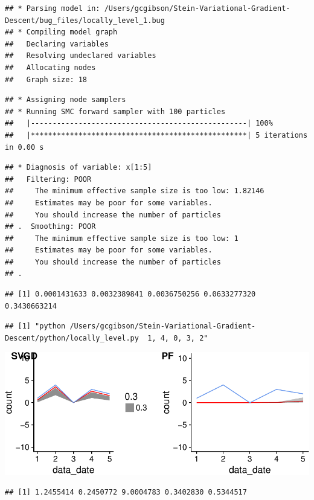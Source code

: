\documentclass[]{article}
\begin{document}
\begin{verbatim}
## * Parsing model in: /Users/gcgibson/Stein-Variational-Gradient-Descent/bug_files/locally_level_1.bug
## * Compiling model graph
##   Declaring variables
##   Resolving undeclared variables
##   Allocating nodes
##   Graph size: 18
\end{verbatim}

\begin{verbatim}
## * Assigning node samplers
## * Running SMC forward sampler with 100 particles
##   |--------------------------------------------------| 100%
##   |**************************************************| 5 iterations in 0.00 s
\end{verbatim}

\begin{verbatim}
## * Diagnosis of variable: x[1:5] 
##   Filtering: POOR
##     The minimum effective sample size is too low: 1.82146 
##     Estimates may be poor for some variables.
##     You should increase the number of particles
## .  Smoothing: POOR
##     The minimum effective sample size is too low: 1 
##     Estimates may be poor for some variables.
##     You should increase the number of particles
## .
\end{verbatim}

\begin{verbatim}
## [1] 0.0001431633 0.0032389841 0.0036750256 0.0633277320 0.3430663214
\end{verbatim}

\begin{verbatim}
## [1] "python /Users/gcgibson/Stein-Variational-Gradient-Descent/python/locally_level.py  1, 4, 0, 3, 2"
\end{verbatim}

\includegraphics{ssvgd_files/figure-latex/unnamed-chunk-4-1.pdf}

\begin{verbatim}
## [1] 1.2455414 0.2450772 9.0004783 0.3402830 0.5344517
\end{verbatim}
\end{document}
